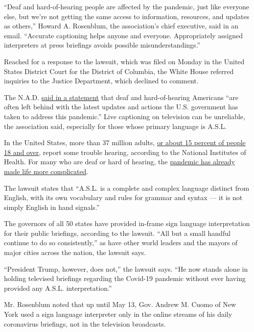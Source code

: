 ``Deaf and hard-of-hearing people are affected by the pandemic, just
like everyone else, but we're not getting the same access to
information, resources, and updates as others,'' Howard A. Rosenblum,
the association's chief executive, said in an email. ``Accurate
captioning helps anyone and everyone. Appropriately assigned
interpreters at press briefings avoids possible misunderstandings.''

Reached for a response to the lawsuit, which was filed on Monday in the
United States District Court for the District of Columbia, the White
House referred inquiries to the Justice Department, which declined to
comment.

The N.A.D.
\href{https://www.nad.org/2020/08/03/nad-sues-white-house/}{said in a
statement} that deaf and hard-of-hearing Americans ``are often left
behind with the latest updates and actions the U.S. government has taken
to address this pandemic.'' Live captioning on television can be
unreliable, the association said, especially for those whose primary
language is A.S.L.

In the United States, more than 37 million adults,
\href{https://www.nidcd.nih.gov/health/statistics/quick-statistics-hearing}{or
about 15 percent of people 18 and over}, report some trouble hearing,
according to the National Institutes of Health. For many who are deaf or
hard of hearing, the
\href{https://www.nytimes.com/2020/06/04/us/coronavirus-deaf-culture-challenges.html}{pandemic
has already made life more complicated}.

The lawsuit states that ``A.S.L. is a complete and complex language
distinct from English, with its own vocabulary and rules for grammar and
syntax --- it is not simply English in hand signals.''

The governors of all 50 states have provided in-frame sign language
interpretation for their public briefings, according to the lawsuit.
``All but a small handful continue to do so consistently,'' as have
other world leaders and the mayors of major cities across the nation,
the lawsuit says.

``President Trump, however, does not,'' the lawsuit says. ``He now
stands alone in holding televised briefings regarding the Covid-19
pandemic without ever having provided any A.S.L. interpretation.''

Mr. Rosenblum noted that up until May 13, Gov. Andrew M. Cuomo of New
York used a sign language interpreter only in the online streams of his
daily coronavirus briefings, not in the television broadcasts.

